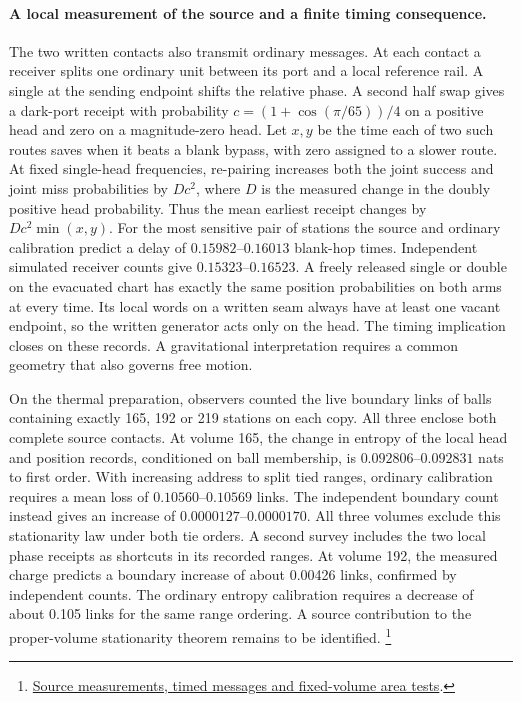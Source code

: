 \documentclass[11pt]{article}
\begin{document}
\paragraph{A local measurement of the source and a finite timing consequence.}
The two written contacts also transmit ordinary messages. At each contact a
receiver splits one ordinary unit between its port and a local reference
rail. A single at the sending endpoint shifts the relative phase. A second
half swap gives a dark-port receipt with probability
$c=(1+\cos(\pi/65))/4$ on a positive head and zero on a magnitude-zero
head. Let $x,y$ be the time each of two such routes saves when it beats a
blank bypass, with zero assigned to a slower route. At fixed single-head
frequencies, re-pairing increases both the joint success and joint miss
probabilities by $Dc^2$, where $D$ is the measured change in the doubly
positive head probability. Thus the mean earliest receipt changes by
$Dc^2\min(x,y)$. For the most sensitive pair of stations the source and
ordinary calibration predict a delay of $0.15982$--$0.16013$ blank-hop times.
Independent simulated receiver counts give $0.15323$--$0.16523$.
A freely released single or double on the evacuated chart has exactly the
same position probabilities on both arms at every time. Its local words
on a written seam always have at least one vacant endpoint, so the written
generator acts only on the head. The timing implication closes on these
records. A gravitational interpretation requires a common geometry that
also governs free motion.

On the thermal preparation, observers counted the live boundary links of
balls containing exactly 165, 192 or 219 stations on each copy. All three
enclose both complete source contacts. At volume 165, the change in entropy
of the local head and position records, conditioned on ball membership,
is $0.092806$--$0.092831$ nats to first order. With increasing address
to split tied ranges, ordinary calibration requires a mean loss of
$0.10560$--$0.10569$ links. The independent boundary count instead gives
an increase of $0.0000127$--$0.0000170$. All three volumes exclude this
stationarity law under both tie orders. A second survey includes the two
local phase receipts as shortcuts in its recorded ranges. At volume 192,
the measured charge predicts a boundary increase of about 0.00426 links,
confirmed by independent counts. The ordinary entropy calibration
requires a decrease of about 0.105 links for the same range ordering.
A source contribution to the proper-volume stationarity theorem remains
to be identified.%
\footnote{\href{https://github.com/FloatingPragma/observer-patch-holography/blob/main/model/experiments/interval_echo_shell_flux/product_address/green_response/material_recoil/overlap_source/native_boundary/stock/aperture/THERMAL_RESULTS.md}{Source measurements, timed messages and fixed-volume area tests}.}
\end{document}
